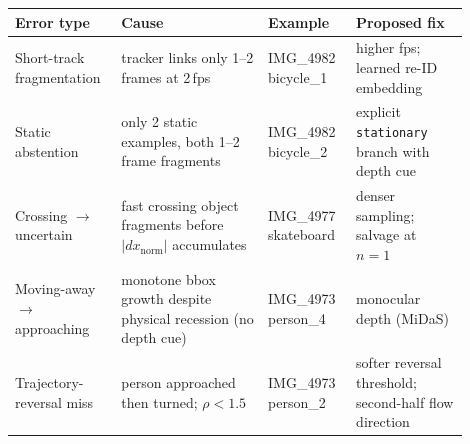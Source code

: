 \begin{tabular}{p{0.19\linewidth}p{0.30\linewidth}p{0.18\linewidth}p{0.23\linewidth}}
\toprule
Error type & Cause & Example & Proposed fix \\
\midrule
Short-track fragmentation & tracker links only 1--2 frames at 2\,fps & IMG\_4982 bicycle\_1 & higher fps; learned re-ID embedding \\
Static abstention & only 2 static examples, both 1--2 frame fragments & IMG\_4982 bicycle\_2 & explicit \texttt{stationary} branch with depth cue \\
Crossing $\to$ uncertain & fast crossing object fragments before $|dx_\mathrm{norm}|$ accumulates & IMG\_4977 skateboard & denser sampling; salvage at $n{=}1$ \\
Moving-away $\to$ approaching & monotone bbox growth despite physical recession (no depth cue) & IMG\_4973 person\_4 & monocular depth (MiDaS) \\
Trajectory-reversal miss & person approached then turned; $\rho{<}1.5$ & IMG\_4973 person\_2 & softer reversal threshold; second-half flow direction \\
\bottomrule
\end{tabular}
